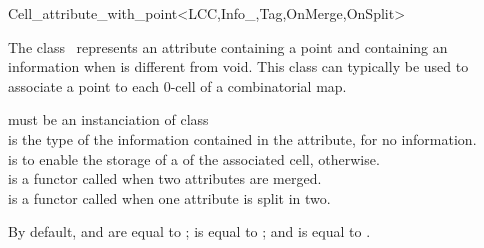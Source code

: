 \ccRefPageBegin
\begin{ccRefClass}{Cell_attribute_with_point<LCC,Info_,Tag,OnMerge,OnSplit>}


\ccDefinition
  
The class \ccRefName\ represents an attribute containing a point and
containing an information when  is different from void.
This class can typically be used to associate a point to each 0-cell
of a combinatorial map. 


\ccIsModel
{}

\ccInheritsFrom
{} %

\ccParameters
{} must be an instanciation of  class\\
 is the type of the information contained in the attribute,  for no information. \\
 is  to enable the storage of a
    of the associated cell,  otherwise.\\
 is a functor called when two attributes are merged.  \\
 is a functor called when one attribute is split in two. 

   By default,  and  are equal to
   ;  is equal to
   ; and  is equal to .

\ccTypes
{}
%
{}
\ccGlue
%
\ccGlue
{}


\end{ccRefClass}
